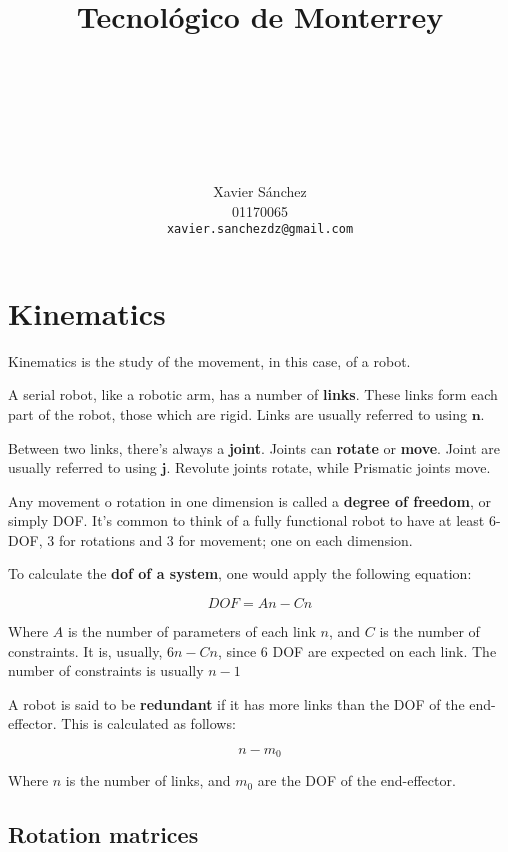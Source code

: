 \documentclass[titlepage, letterpaper, fleqn]{article}
\title{
\vspace{1in}
\textbf{Tecnológico de Monterrey} \\
\vspace{0.5in}
\textmd{\mahclass} \\
\large{\textit{\mahteacher}} \\
\vspace{0.5in}
\textsc{\mahtitle}\\
\author{Xavier Sánchez \\
01170065\\
\texttt{xavier.sanchezdz@gmail.com}}
\date{\mahdate}
}
\let\bs\mathbf
\begin{document}
\begin{titlepage}
\maketitle
\end{titlepage}

%
%

\section{Kinematics} %
\label{sec:kinematics}

Kinematics is the study of the movement, in this case, of a robot.

A serial robot, like a robotic arm, has a number of \textbf{links}.
These links form each part of the robot, those which are rigid.
Links are usually referred to using $\bs{n}$.

Between two links, there's always a \textbf{joint}.
Joints can \textbf{rotate} or \textbf{move}.
Joint are usually referred to  using $\bs{j}$.
Revolute joints rotate, while Prismatic joints move.

Any movement o rotation in one dimension is called a \textbf{degree of freedom}, or simply DOF.
It's common to think of a fully functional robot to have at least 6-DOF,
3 for rotations and 3 for movement; one on each dimension.

To calculate the \textbf{dof of a system}, one would apply the following equation:

\begin{equation}
    \label{eq:dof_system}
    DOF = An - Cn
\end{equation}

Where $A$ is the number of parameters of each link $n$,
and $C$ is the number of constraints.
It is, usually, $6n-Cn$, since 6 DOF are expected on each link.
The number of constraints is usually $n-1$

A robot is said to be \textbf{redundant} if it has more links than the DOF of the end-effector.
This is calculated as follows:

\begin{equation}
    \label{eq:dof_redundancy}
    n-m_0
\end{equation}

Where $n$ is the number of links, and $m_0$ are the DOF of the end-effector.

\subsection{Rotation matrices} %
\label{sec:rotation_matrices}
\end{document}
